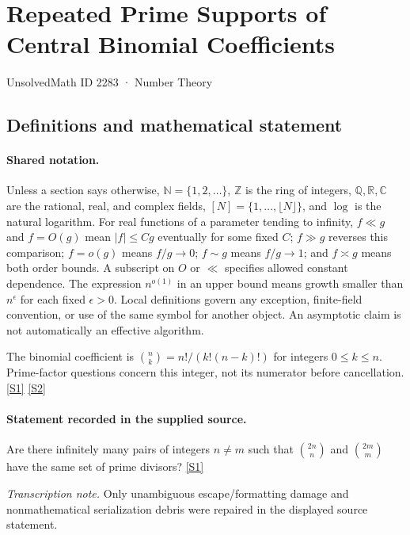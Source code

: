 \documentclass[11pt,a4paper]{article}
\newcommand{\N}{\mathbb{N}}
\newcommand{\Z}{\mathbb{Z}}
\newcommand{\Q}{\mathbb{Q}}
\newcommand{\R}{\mathbb{R}}
\newcommand{\C}{\mathbb{C}}
\newcommand{\sref}[2]{\hyperlink{source:#1:#2}{[S#2]}}
\begin{document}

\setcounter{section}{2282}

\section{Repeated Prime Supports of Central Binomial Coefficients}\label{2283}

{\small\sffamily UnsolvedMath ID 2283 · Number Theory}

\subsection{Definitions and mathematical statement}

\paragraph{Shared notation.}Unless a section says otherwise, $\N=\{1,2,\ldots\}$,
$\Z$ is the ring of integers, $\Q,\R,\C$ are the rational, real, and complex
fields, $[N]=\{1,\ldots,\lfloor N\rfloor\}$, and $\log$ is the natural
logarithm. For real functions of a parameter tending to infinity,
$f\ll g$ and $f=O(g)$ mean $|f|\leq Cg$ eventually for some fixed $C$;
$f\gg g$ reverses this comparison; $f=o(g)$ means $f/g\to0$;
$f\sim g$ means $f/g\to1$; and $f\asymp g$ means both order bounds.
A subscript on $O$ or $\ll$ specifies allowed constant dependence.
The expression $n^{o(1)}$ in an upper bound means growth smaller than
$n^\epsilon$ for each fixed $\epsilon>0$. Local definitions govern any
exception, finite-field convention, or use of the same symbol for another
object. An asymptotic claim is not automatically an effective algorithm.



The binomial coefficient is $\binom nk=n!/(k!(n-k)!)$ for integers $0\leq k\leq n$. Prime-factor questions concern this integer, not its numerator before cancellation. \sref{2283}{1} \sref{2283}{2}

\paragraph{Statement recorded in the supplied source.}
Are there infinitely many pairs of integers $n\neq m$ such that $\binom{2n}{n}$ and $\binom{2m}{m}$ have the same set of prime divisors? \sref{2283}{1}

{\small\emph{Transcription note.} Only unambiguous escape/formatting damage and nonmathematical serialization debris were repaired in the displayed source statement.}
\end{document}

